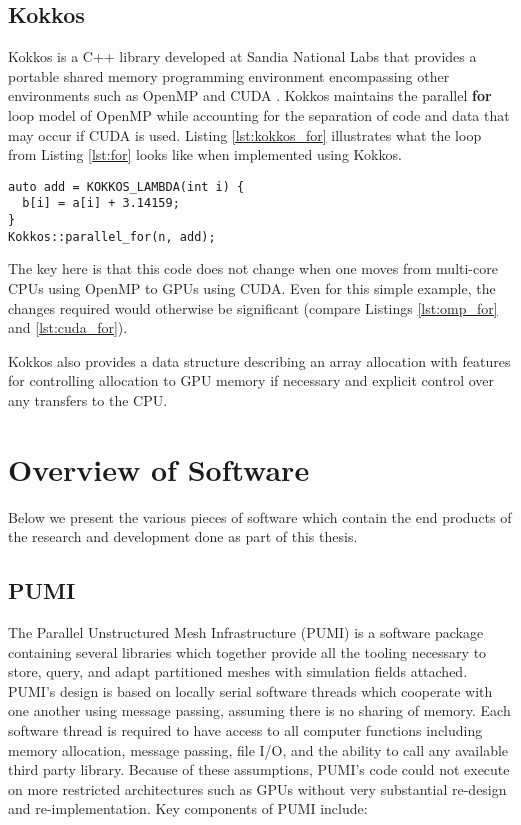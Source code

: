 \subsection{Kokkos}
\label{sec:kokkos}

Kokkos is a C++ library developed at Sandia National Labs that provides
a portable shared memory programming environment encompassing other
environments such as OpenMP and CUDA \cite{edwards2013kokkos}.
Kokkos maintains the parallel {\bf for} loop model of OpenMP while
accounting for the separation of code and data that may occur if CUDA is used.
Listing \ref{lst:kokkos_for} illustrates what the loop from Listing
\ref{lst:for} looks like when implemented using Kokkos.

\begin{lstlisting}[float,style=dan-style,caption=Kokkos {\bf for} loop,label=lst:kokkos_for]
auto add = KOKKOS_LAMBDA(int i) {
  b[i] = a[i] + 3.14159;
}
Kokkos::parallel_for(n, add);
\end{lstlisting}

The key here is that this code does not change when one moves
from multi-core CPUs using OpenMP to GPUs using CUDA.
Even for this simple example, the changes required would otherwise
be significant (compare Listings \ref{lst:omp_for} and \ref{lst:cuda_for}).

Kokkos also provides a data structure describing an array allocation
with features for controlling allocation to GPU memory if necessary
and explicit control over any transfers to the CPU.

\section{Overview of Software}

Below we present the various pieces of software which contain
the end products of the research and development done as
part of this thesis.

\subsection{PUMI}

The Parallel Unstructured Mesh Infrastructure (PUMI) is a software package
containing several libraries which together provide all the tooling
necessary to store, query, and adapt partitioned meshes with
simulation fields attached.
PUMI's design is based on locally serial software threads which
cooperate with one another using message passing, assuming
there is no sharing of memory.
Each software thread is required to have access to all computer
functions including memory allocation, message passing, file I/O, and the ability
to call any available third party library.
Because of these assumptions, PUMI's code could not execute
on more restricted architectures such as GPUs without very
substantial re-design and re-implementation.
Key components of PUMI include:

